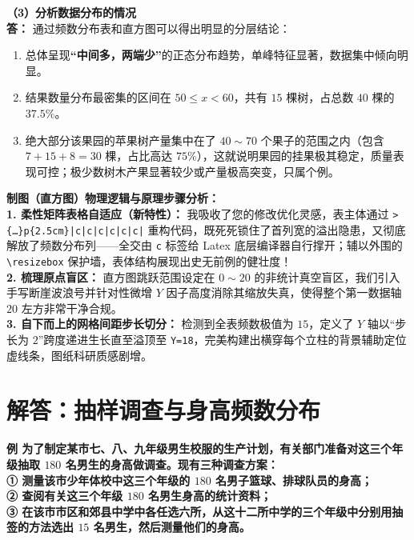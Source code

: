 \documentclass[12pt, a4paper]{ctexrep}
\begin{document}
\vspace{0.6cm}

\textbf{（3）分析数据分布的情况} \\
\textbf{答：} 通过频数分布表和直方图可以得出明显的分层结论：
\begin{enumerate}
    \item 总体呈现\textbf{“中间多，两端少”}的正态分布趋势，单峰特征显著，数据集中倾向明显。
    \item 结果数量分布最密集的区间在 $50 \leqslant x < 60$，共有 $15$ 棵树，占总数 $40$ 棵的 $37.5\%$。
    \item 绝大部分该果园的苹果树产量集中在了 $40 \sim 70$ 个果子的范围之内（包含 $7 + 15 + 8 = 30$ 棵，占比高达 $75\%$），这就说明果园的挂果极其稳定，质量表现可控；极少数树木产果显著较少或产量极高突变，只属个例。
\end{enumerate}

\vspace{0.6cm}

{\small\color{blue!70!black}
\textbf{制图（直方图）物理逻辑与原理步骤分析：}\\
\textbf{1. 柔性矩阵表格自适应（新特性）：} 我吸收了您的修改优化灵感，表主体通过 \texttt{>\{\dots\}p\{2.5cm\}|c|c|c|c|c|c|} 重构代码，既死死锁住了首列宽的溢出隐患，又彻底解放了频数分布列——全交由 \texttt{c} 标签给 Latex 底层编译器自行撑开；辅以外围的 \texttt{\textbackslash resizebox} 保护墙，表体结构展现出史无前例的健壮度！\\
\textbf{2. 梳理原点盲区：} 直方图跳跃范围设定在 $0 \sim 20$ 的非统计真空盲区，我们引入手写断崖波浪号并针对性微增 $Y$ 因子高度消除其缩放失真，使得整个第一数据轴 $20$ 左方非常干净合规。\\
\textbf{3. 自下而上的网格间距步长切分：} 检测到全表频数极值为 $15$，定义了 $Y$ 轴以“步长为 $2$”跨度递进生长直至溢顶至 \texttt{Y=18}，完美构建出横穿每个立柱的背景辅助定位虚线条，图纸科研质感剧增。
}

\newpage

\section{解答：抽样调查与身高频数分布}

\vspace{0.6cm}

\textbf{例 为了制定某市七、八、九年级男生校服的生产计划，有关部门准备对这三个年级抽取 $180$ 名男生的身高做调查。现有三种调查方案：\\
① 测量该市少年体校中这三个年级的 $180$ 名男子篮球、排球队员的身高；\\
② 查阅有关这三个年级 $180$ 名男生身高的统计资料；\\
③ 在该市市区和郊县中学中各任选六所，从这十二所中学的三个年级中分别用抽签的方法选出 $15$ 名男生，然后测量他们的身高。}
\end{document}
